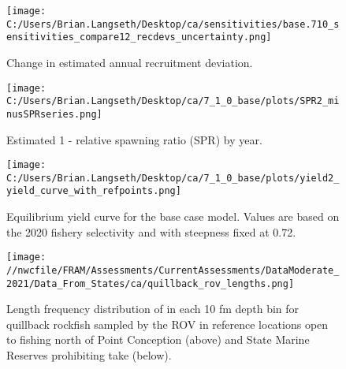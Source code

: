 \documentclass[11pt,
  english,
  a4paper,
]{article}
\begin{document}
\tagmcend\tagstructend


\begin{figure}
\centering
\texttt{[image: C:/Users/Brian.Langseth/Desktop/ca/sensitivities/base.710\_sensitivities\_compare12\_recdevs\_uncertainty.png]}
\caption{Change in estimated annual recruitment deviation.\label{fig:sens-recdev}}
\end{figure}

\tagmcend\tagstructend


\begin{figure}
\centering
\texttt{[image: C:/Users/Brian.Langseth/Desktop/ca/7\_1\_0\_base/plots/SPR2\_minusSPRseries.png]}
\caption{Estimated 1 - relative spawning ratio (SPR) by year.\label{fig:1-spr}}
\end{figure}

\tagmcend\tagstructend


\begin{figure}
\centering
\texttt{[image: C:/Users/Brian.Langseth/Desktop/ca/7\_1\_0\_base/plots/yield2\_yield\_curve\_with\_refpoints.png]}
\caption{Equilibrium yield curve for the base case model. Values are based on the 2020 fishery selectivity and with steepness fixed at 0.72.\label{fig:yield}}
\end{figure}

\tagmcend\tagstructend


\begin{figure}
\centering
\texttt{[image: //nwcfile/FRAM/Assessments/CurrentAssessments/DataModerate\_2021/Data\_From\_States/ca/quillback\_rov\_lengths.png]}
\caption{Length frequency distribution of in each 10 fm depth bin for quillback rockfish sampled by the ROV in reference locations open to fishing north of Point Conception (above) and State Marine Reserves prohibiting take (below).\label{fig:ca-ROV}}
\end{figure}
\end{document}
